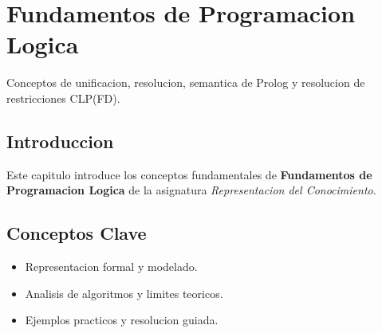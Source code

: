 \chapter{Fundamentos de Programacion Logica}
\label{ch:programacion_logica}

Conceptos de unificacion, resolucion, semantica de Prolog y resolucion de restricciones CLP(FD).

\section{Introduccion}
Este capitulo introduce los conceptos fundamentales de \textbf{Fundamentos de Programacion Logica} de la asignatura \textit{Representacion del Conocimiento}.

\section{Conceptos Clave}
\begin{itemize}
    \item Representacion formal y modelado.
    \item Analisis de algoritmos y limites teoricos.
    \item Ejemplos practicos y resolucion guiada.
\end{itemize}

